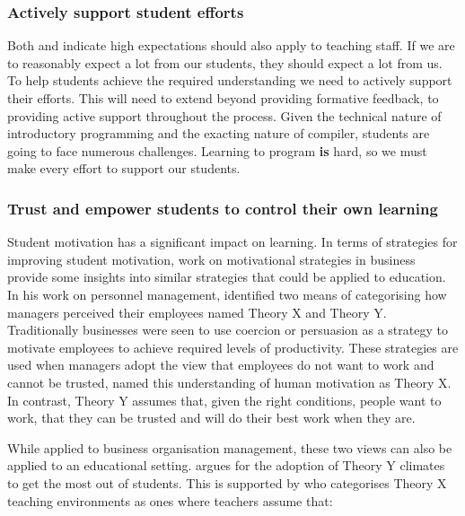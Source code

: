 
\subsubsection{Actively support student efforts} %
\label{ssub:actively_support_student_efforts}

Both \citet{Chickering:1987} and \citet{Soetanto:2003,Soetanto:2012} indicate high expectations should also apply to teaching staff. If we are to reasonably expect a lot from our students, they should expect a lot from us. To help students achieve the required understanding we need to actively support their efforts. This will need to extend beyond providing formative feedback, to providing active support throughout the process. Given the technical nature of introductory programming and the exacting nature of compiler, students are going to face numerous challenges. Learning to program \textbf{is} hard, so we must make every effort to support our students.


\subsubsection{Trust and empower students to control their own learning} %
\label{ssub:trust_and_empower_students_to_control_their_own_learning}

Student motivation has a significant impact on learning. In terms of strategies for improving student motivation, \citet{McGregor:1960} work on motivational strategies in business provide some insights into similar strategies that could be applied to education.  In his work on personnel management, \citet{McGregor:1960} identified two means of categorising how managers perceived their employees named Theory X and Theory Y. Traditionally businesses were seen to use coercion or persuasion as a strategy to motivate employees to achieve required levels of productivity. These strategies are used when managers adopt the view that employees do not want to work and cannot be trusted, \citet{McGregor:1960} named this understanding of human motivation as Theory X. In contrast, Theory Y assumes that, given the right conditions, people want to work, that they can be trusted and will do their best work when they are.

While applied to business organisation management, these two views can also be applied to an educational setting. \citet{Biggs:2007} argues for the adoption of Theory Y climates to get the most out of students. This is supported by \citet{Markwell:2004} who categorises Theory X teaching environments as ones where teachers assume that:

